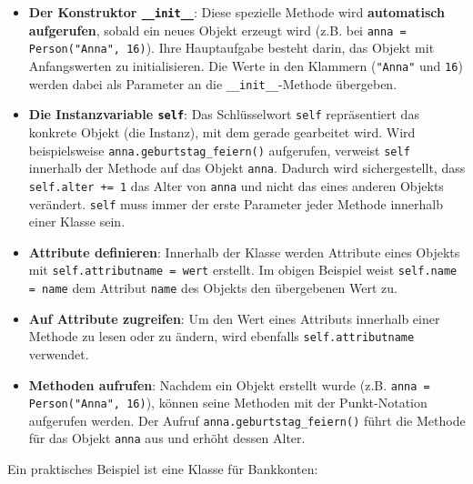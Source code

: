\begin{itemize}
	\item \textbf{Der Konstruktor \lstinline|__init__|}: Diese spezielle Methode wird \textbf{automatisch aufgerufen}, sobald ein neues Objekt erzeugt wird (z.B. bei \lstinline|anna = Person("Anna", 16)|). Ihre Hauptaufgabe besteht darin, das Objekt mit Anfangswerten zu initialisieren. Die Werte in den Klammern (\lstinline|"Anna"| und \lstinline|16|) werden dabei als Parameter an die \lstinline|__init__|-Methode übergeben.
	
	\item \textbf{Die Instanzvariable \lstinline|self|}: Das Schlüsselwort \lstinline|self| repräsentiert das konkrete Objekt (die Instanz), mit dem gerade gearbeitet wird. Wird beispielsweise \lstinline|anna.geburtstag_feiern()| aufgerufen, verweist \lstinline|self| innerhalb der Methode auf das Objekt \lstinline|anna|. Dadurch wird sichergestellt, dass \lstinline|self.alter += 1| das Alter von \lstinline|anna| und nicht das eines anderen Objekts verändert. \lstinline|self| muss immer der erste Parameter jeder Methode innerhalb einer Klasse sein.
	
	\item \textbf{Attribute definieren}: Innerhalb der Klasse werden Attribute eines Objekts mit \lstinline|self.attributname = wert| erstellt. Im obigen Beispiel weist \lstinline|self.name = name| dem Attribut \lstinline|name| des Objekts den übergebenen Wert zu.
	
	\item \textbf{Auf Attribute zugreifen}: Um den Wert eines Attributs innerhalb einer Methode zu lesen oder zu ändern, wird ebenfalls \lstinline|self.attributname| verwendet.
	
	\item \textbf{Methoden aufrufen}: Nachdem ein Objekt erstellt wurde (z.B. \lstinline|anna = Person("Anna", 16)|), können seine Methoden mit der Punkt-Notation aufgerufen werden. Der Aufruf \lstinline|anna.geburtstag_feiern()| führt die Methode für das Objekt \lstinline|anna| aus und erhöht dessen Alter.
\end{itemize}


\begin{myexample}
Ein praktisches Beispiel ist eine Klasse für Bankkonten:


\end{myexample}

